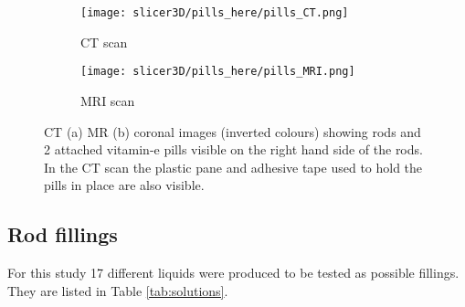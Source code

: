 \begin{figure}[!thb]
\centering
  \begin{subfigure}[b]{0.45\textwidth}
  \centering
    \texttt{[image: slicer3D/pills\_here/pills\_CT.png]}
    \caption{CT scan}
    \label{fig:pills_CT}
  \end{subfigure}
  \begin{subfigure}[b]{0.45\textwidth}
  \centering
      \texttt{[image: slicer3D/pills\_here/pills\_MRI.png]}
    \caption{MRI scan}
    \label{fig:pills_MR}
  \end{subfigure}
  \caption{CT (a) MR (b) coronal images (inverted colours) showing rods and 2 attached vitamin-e pills visible on the right hand side of the rods. In the CT scan the plastic pane and adhesive tape used to hold the pills in place are also visible.}
  \label{fig:pills}
\end{figure}

\clearpage

\subsection{Rod fillings}

For this study 17 different liquids were produced to be tested as possible fillings.
They are listed in Table \ref{tab:solutions}.


